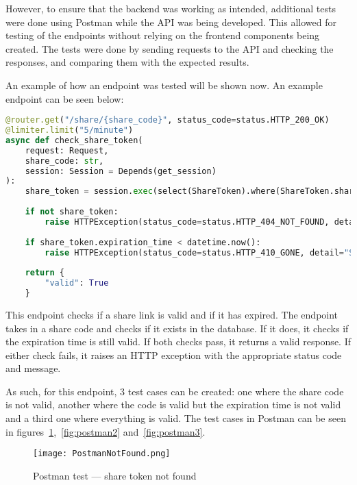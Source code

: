 However, to ensure that the backend was working as intended, additional tests were done using Postman while the API was being developed. This allowed for testing of the endpoints without relying on the frontend components being created. The tests were done by sending requests to the API and checking the responses, and comparing them with the expected results. 

An example of how an endpoint was tested will be shown now. An example endpoint can be seen below:

\begin{lstlisting}[language=Python, caption=Example endpoint for checking a share link for expiration time]
    @router.get("/share/{share_code}", status_code=status.HTTP_200_OK)
@limiter.limit("5/minute")
async def check_share_token(
    request: Request,
    share_code: str,
    session: Session = Depends(get_session)
):
    share_token = session.exec(select(ShareToken).where(ShareToken.share_code == share_code)).first()
    
    if not share_token:
        raise HTTPException(status_code=status.HTTP_404_NOT_FOUND, detail="Share token not found")
    
    if share_token.expiration_time < datetime.now():
        raise HTTPException(status_code=status.HTTP_410_GONE, detail="Share token has expired")
    
    return {
        "valid": True
    }
\end{lstlisting}

This endpoint checks if a share link is valid and if it has expired. The endpoint takes in a share code and checks if it exists in the database. If it does, it checks if the expiration time is still valid. If both checks pass, it returns a valid response. If either check fails, it raises an HTTP exception with the appropriate status code and message.

As such, for this endpoint, 3 test cases can be created: one where the share code is not valid, another where the code is valid but the expiration time is not valid and a third one where everything is valid. The test cases in Postman can be seen in figures~\ref{fig:postman1},~\ref{fig:postman2} and~\ref{fig:postman3}.

\begin{figure}[htbp]
    \centering
    \texttt{[image: PostmanNotFound.png]}
    \caption{Postman test --- share token not found}\label{fig:postman1}
\end{figure}

